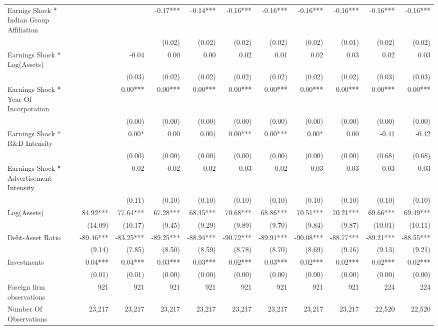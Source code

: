 \begin{sidewaystable}[ht]
{\begin{tabular}{lrrrrrrrrrr}
Earnigs Shock * Indian Group Affiliation &   &   & -0.17*** & -0.14*** & -0.16*** & -0.16*** & -0.16*** & -0.16*** & -0.16*** & -0.16*** \\
  &   &   & (0.02) & (0.02) & (0.02) & (0.02) & (0.02) & (0.01) & (0.02) & (0.02) \\
Earnings Shock * Log(Assets) &   & -0.04    & 0.00    & 0.00    & 0.02    & 0.01    & 0.02    & 0.03    & 0.02    & 0.03    \\
  &   & (0.03) & (0.02) & (0.02) & (0.02) & (0.02) & (0.02) & (0.02) & (0.03) & (0.03) \\
Earnings Shock * Year Of Incorporation &   & 0.00*** & 0.00*** & 0.00*** & 0.00*** & 0.00*** & 0.00*** & 0.00*** & 0.00*** & 0.00*** \\
  &   & (0.00) & (0.00) & (0.00) & (0.00) & (0.00) & (0.00) & (0.00) & (0.00) & (0.00) \\
Earnings Shock * R\&D Intensity &   & 0.00*    & 0.00    & 0.00$\dagger$ & 0.00*** & 0.00*** & 0.00*    & 0.00    & -0.41    & -0.42    \\
  &   & (0.00) & (0.00) & (0.00) & (0.00) & (0.00) & (0.00) & (0.00) & (0.68) & (0.68) \\
Earnings Shock * Advertisement Intensity &   & -0.02    & -0.02    & -0.02    & -0.03    & -0.02    & -0.03    & -0.03    & -0.03    & -0.03    \\
  &   & (0.11) & (0.10) & (0.10) & (0.10) & (0.10) & (0.10) & (0.10) & (0.10) & (0.10) \\
Log(Assets) & 84.92*** & 77.64*** & 67.28*** & 68.45*** & 70.68*** & 68.86*** & 70.51*** & 70.21*** & 69.66*** & 69.49*** \\
  & (14.09) & (10.17) & (9.45) & (9.29) & (9.89) & (9.70) & (9.84) & (9.87) & (10.01) & (10.11) \\
Debt-Asset Ratio & -89.46*** & -83.25*** & -89.25*** & -88.94*** & -90.72*** & -89.91*** & -90.08*** & -88.77*** & -89.21*** & -88.55*** \\
  & (9.14) & (7.85) & (8.50) & (8.59) & (8.78) & (8.70) & (8.69) & (9.16) & (9.13) & (9.21) \\
Investments & 0.04*** & 0.04*** & 0.03*** & 0.03*** & 0.02*** & 0.03*** & 0.02*** & 0.02*** & 0.02*** & 0.02*** \\
  & (0.01) & (0.01) & (0.00) & (0.00) & (0.00) & (0.00) & (0.00) & (0.00) & (0.00) & (0.00) \\
\midrule
Foreign firm observations & 921 & 921 & 921 & 921 & 921 & 921 & 921 & 921 & 224 & 224 \\
Number Of Observations & 23,217 & 23,217 & 23,217 & 23,217 & 23,217 & 23,217 & 23,217 & 23,217 & 22,520 & 22,520 \\

\end{tabular}}
\end{sidewaystable}
